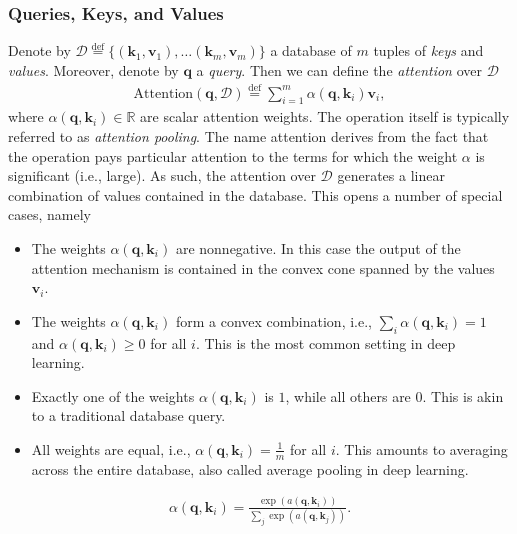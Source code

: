 \documentclass[a4paper,12pt]{article}
\theoremstyle{definition}
\begin{document}
\subsubsection*{Queries, Keys, and Values}
Denote by $\mathcal{D} \stackrel{\mathrm{def}}{=} \{(\mathbf{k}_1, \mathbf{v}_1), \ldots (\mathbf{k}_m, \mathbf{v}_m)\}$ a database of $m$ tuples of \emph{keys} and \emph{values}.
Moreover, denote by $\mathbf{q}$ a \emph{query}. Then we can define the \emph{attention} over $\mathcal{D}$
\begin{equation*}
    \begin{aligned}
        \mathrm{Attention}(\mathbf{q}, \mathcal{D}) \stackrel{\mathrm{def}}{=} \sum_{i=1}^m \alpha(\mathbf{q}, \mathbf{k}_i) \mathbf{v}_i,
    \end{aligned}
\end{equation*}
where $\alpha(\mathbf{q}, \mathbf{k}_i) \in \mathbb{R}$ are scalar attention weights. The operation itself is typically referred to as \emph{attention pooling}.
The name attention derives from the fact that the operation pays particular attention to the terms for which the weight $\alpha$ is significant (i.e., large).
As such, the attention over $\mathcal{D}$ generates a linear combination of values contained in the database. This opens a number of special cases, namely
\begin{itemize}
    \item The weights $\alpha(\mathbf{q}, \mathbf{k}_i)$ are nonnegative. In this case the output of the attention mechanism is contained in the convex cone spanned by the values $\mathbf{v}_i$.
    \item The weights $\alpha(\mathbf{q}, \mathbf{k}_i)$ form a convex combination, i.e., $\sum_i \alpha(\mathbf{q}, \mathbf{k}_i) = 1$ and $\alpha(\mathbf{q}, \mathbf{k}_i) \geq 0$ for all $i$.
          This is the most common setting in deep learning.
    \item Exactly one of the weights $\alpha(\mathbf{q}, \mathbf{k}_i)$ is $1$, while all others are $0$. This is akin to a traditional database query.
    \item All weights are equal, i.e., $\alpha(\mathbf{q}, \mathbf{k}_i) = \frac{1}{m}$ for all $i$. This amounts to averaging across the entire database, also called average pooling in deep learning.
\end{itemize}
\begin{equation*}
    \begin{aligned}
        \alpha(\mathbf{q}, \mathbf{k}_i) = \frac{\exp(a(\mathbf{q}, \mathbf{k}_i))}{\sum_j \exp(a(\mathbf{q}, \mathbf{k}_j))}.
    \end{aligned}
\end{equation*}
\end{document}
